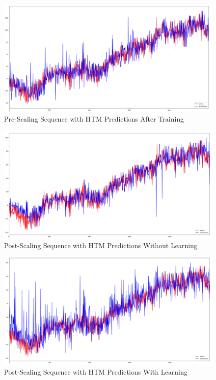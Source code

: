 \documentclass[oneside,12pt,openany]{book}
\begin{document}
    \FloatBarrier
        \begin{figure}[hbt!]
            \centering
            \includegraphics[width=\linewidth]{images/NoScaling-Unchanged.png}
            \caption{Pre-Scaling Sequence with HTM Predictions After Training}
            \label{fig:gennoscaleunchanged}
        \end{figure}
        \begin{figure}[hbt!]
            \centering
            \includegraphics[width=\linewidth]{images/Scaling-NoLearning-Unchanged.png}
            \caption{Post-Scaling Sequence with HTM Predictions Without Learning}
            \label{fig:genscalenolearningunchanged}
        \end{figure}
        \begin{figure}[hbt!]
            \centering
            \includegraphics[width=\linewidth]{images/Scaling-Learning-Unchanged.png}
            \caption{Post-Scaling Sequence with HTM Predictions With Learning}
            \label{fig:genscalelearningunchanged}
        \end{figure}
    \FloatBarrier
    
\end{document}
